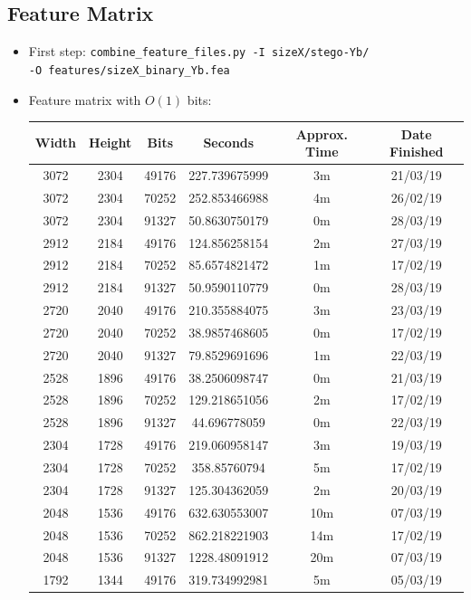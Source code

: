 \documentclass[11pt,a4paper]{report}
\begin{document}
\subsection{Feature Matrix}
\begin{itemize}
\item First step: \texttt{combine\_feature\_files.py -I sizeX/stego-Yb/} \\
         \texttt{-O features/sizeX\_binary\_Yb.fea}

\item Feature matrix with $O(1)$ bits:
  \begin{center}
  \begin{tabular}{ c c c | c c c }
  Width & Height & Bits & Seconds & Approx. Time & Date Finished \\ \hline
  3072 & 2304 & 49176 & 227.739675999 & 3m & 21/03/19 \\
  3072 & 2304 & 70252 & 252.853466988 & 4m & 26/02/19 \\
  3072 & 2304 & 91327 & 50.8630750179 & 0m & 28/03/19 \\
  2912 & 2184 & 49176 & 124.856258154 & 2m & 27/03/19 \\
  2912 & 2184 & 70252 & 85.6574821472 & 1m & 17/02/19 \\
  2912 & 2184 & 91327 & 50.9590110779 & 0m & 28/03/19 \\
  2720 & 2040 & 49176 & 210.355884075 & 3m & 23/03/19 \\
  2720 & 2040 & 70252 & 38.9857468605 & 0m & 17/02/19 \\
  2720 & 2040 & 91327 & 79.8529691696 & 1m & 22/03/19 \\
  2528 & 1896 & 49176 & 38.2506098747 & 0m & 21/03/19 \\
  2528 & 1896 & 70252 & 129.218651056 & 2m & 17/02/19 \\
  2528 & 1896 & 91327 & 44.696778059 & 0m & 22/03/19 \\
  2304 & 1728 & 49176 & 219.060958147 & 3m & 19/03/19 \\
  2304 & 1728 & 70252 & 358.85760794 & 5m & 17/02/19 \\
  2304 & 1728 & 91327 & 125.304362059 & 2m & 20/03/19 \\
  2048 & 1536 & 49176 & 632.630553007 & 10m & 07/03/19 \\
  2048 & 1536 & 70252 & 862.218221903 & 14m & 17/02/19 \\
  2048 & 1536 & 91327 & 1228.48091912 & 20m & 07/03/19 \\
  1792 & 1344 & 49176 & 319.734992981 & 5m & 05/03/19 \\

\end{tabular}
\end{center}
\end{itemize}
\end{document}
